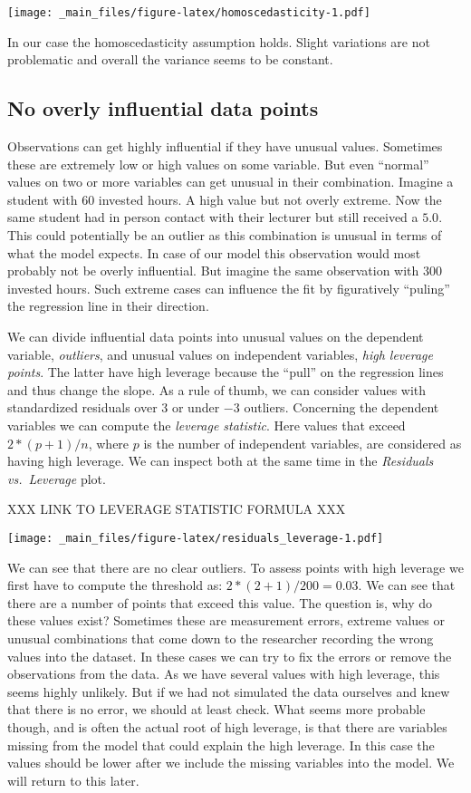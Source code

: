 \documentclass[
]{book}
\begin{document}
\texttt{[image: \_main\_files/figure-latex/homoscedasticity-1.pdf]}

In our case the homoscedasticity assumption holds. Slight variations are not
problematic and overall the variance seems to be constant.

\hypertarget{no-overly-influential-data-points}{%
\subsection{No overly influential data points}\label{no-overly-influential-data-points}}

Observations can get highly influential if they have unusual values. Sometimes
these are extremely low or high values on some variable. But even ``normal'' values
on two or more variables can get unusual in their combination. Imagine a student
with \(60\) invested hours. A high value but not overly extreme. Now the same student
had in person contact with their lecturer but still received a \(5.0\). This could
potentially be an outlier as this combination is unusual in terms of what the
model expects. In case of our model this observation would most probably not be
overly influential. But imagine the same observation with \(300\) invested hours.
Such extreme cases can influence the fit by figuratively ``puling'' the regression
line in their direction.

We can divide influential data points into unusual values on the dependent
variable, \emph{outliers}, and unusual values on independent variables,
\emph{high leverage points}. The latter have high leverage because the ``pull'' on the
regression lines and thus change the slope. As a rule of thumb, we can consider
values with standardized residuals over \(3\) or under \(-3\) outliers.
Concerning the dependent variables we can compute the \emph{leverage statistic}.
Here values that exceed \(2 * (p + 1) / n\), where \(p\) is the number of independent
variables, are considered as having high leverage.
We can inspect both at the same time in the \emph{Residuals vs.~Leverage} plot.

XXX LINK TO LEVERAGE STATISTIC FORMULA XXX

\texttt{[image: \_main\_files/figure-latex/residuals\_leverage-1.pdf]}

We can see that there are no clear outliers. To assess points with high leverage
we first have to compute the threshold as: \(2 * (2 + 1) / 200 = 0.03\). We can
see that there are a number of points that exceed this value. The question is,
why do these values exist? Sometimes these are measurement errors, extreme values
or unusual combinations that come down to the researcher recording the wrong
values into the dataset. In these cases we can try to fix the errors or remove
the observations from the data. As we have several values with high leverage,
this seems highly unlikely. But if we had not simulated the data ourselves and
knew that there is no error, we should at least check. What seems more probable
though, and is often the actual root of high leverage, is that there are
variables missing from the model that could explain the high leverage.
In this case the values should be lower after we include the missing
variables into the model. We will return to this later.
\end{document}
